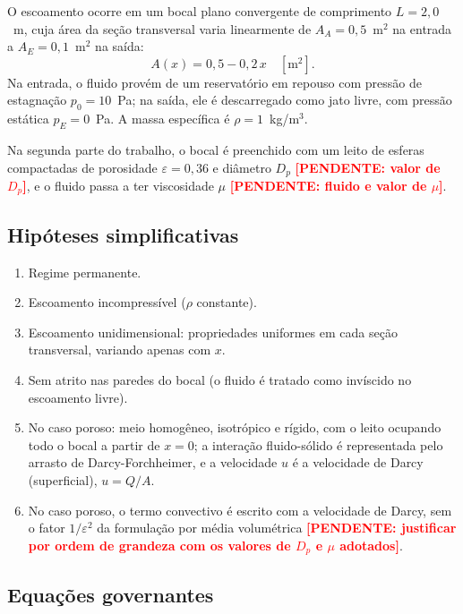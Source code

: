 \documentclass[11pt,a4paper]{article}
\newcommand{\pendente}[1]{\textcolor{red}{\textbf{[PENDENTE: #1]}}}
\begin{document}
O escoamento ocorre em um bocal plano convergente de comprimento
$L=2{,}0$~m, cuja área da seção transversal varia linearmente de
$A_A=0{,}5$~m$^2$ na entrada a $A_E=0{,}1$~m$^2$ na saída:
\begin{equation}
  A(x)=0{,}5-0{,}2\,x \quad [\mathrm{m^2}] .
\end{equation}
Na entrada, o fluido provém de um reservatório em repouso com pressão de
estagnação $p_0=10$~Pa; na saída, ele é descarregado como jato livre, com
pressão estática $p_E=0$~Pa. A massa específica é $\rho=1$~kg/m$^3$.

Na segunda parte do trabalho, o bocal é preenchido com um leito de esferas
compactadas de porosidade $\varepsilon=0{,}36$ e diâmetro $D_p$
\pendente{valor de $D_p$}, e o fluido passa a ter viscosidade $\mu$
\pendente{fluido e valor de $\mu$}.

\subsection{Hipóteses simplificativas}

\begin{enumerate}
  \item Regime permanente.
  \item Escoamento incompressível ($\rho$ constante).
  \item Escoamento unidimensional: propriedades uniformes em cada seção
        transversal, variando apenas com $x$.
  \item Sem atrito nas paredes do bocal (o fluido é tratado como invíscido
        no escoamento livre).
  \item No caso poroso: meio homogêneo, isotrópico e rígido, com o leito
        ocupando todo o bocal a partir de $x=0$; a interação fluido-sólido é
        representada pelo arrasto de Darcy-Forchheimer, e a velocidade $u$
        é a velocidade de Darcy (superficial), $u=Q/A$.
  \item No caso poroso, o termo convectivo é escrito com a velocidade de
        Darcy, sem o fator $1/\varepsilon^2$ da formulação por média
        volumétrica \pendente{justificar por ordem de grandeza com os
        valores de $D_p$ e $\mu$ adotados}.
\end{enumerate}

\subsection{Equações governantes}
\end{document}
